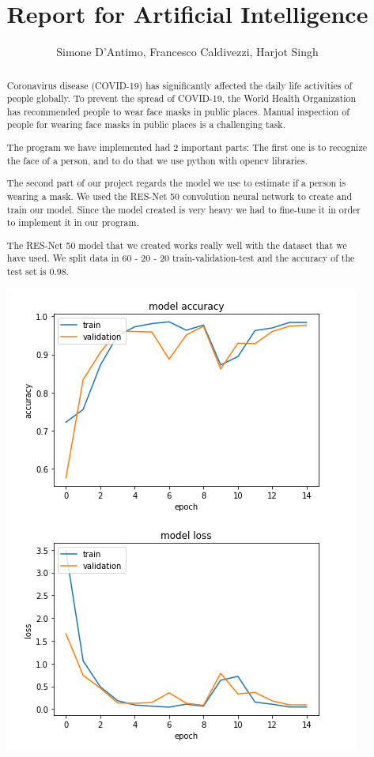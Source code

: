 \documentclass[]{article}
\title{ Report for Artificial Intelligence }
\author{ Simone D'Antimo, Francesco Caldivezzi, Harjot Singh}
\begin{document}
\maketitle

\begin{abstract}
Coronavirus disease (COVID-19) has significantly affected the daily life activities of people globally.
To prevent the spread of COVID-19, the World Health Organization has recommended people to wear face masks in public places.
Manual inspection of people for wearing face masks in public places is a challenging task.

The program we have implemented had 2 important parts: 
The first one is to recognize the face of a person, and to do that we use python with opencv libraries.

The second part of our project regards the model we use to estimate if a person is wearing a mask. We used the RES-Net 50 convolution neural network to create and train our model. Since the model created is very heavy we had to fine-tune it in order to implement it in our program.

The RES-Net 50 model that we created works really well with the dataset that we have used. We split data in 60 - 20 - 20 train-validation-test and the accuracy of the test set is 0.98.

\includegraphics{LossAndAccuracy}


\end{abstract}
\end{document}
